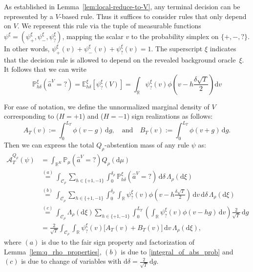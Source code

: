 \documentclass[10pt]{article}
\newcommand{\dd}{\mathrm{d}}
\theoremstyle{plain}
\begin{document}
As established in Lemma~\ref{lem:local-reduce-to-V}, any terminal decision can be represented by a $V$-based rule. Thus it suffices to consider rules that only depend on $V$. We represent this rule via the tuple of measurable functions $\psi^\xi = (\psi_+^\xi, \psi_-^\xi, \psi_?^\xi)$, mapping the scalar $v$ to the probability simplex on $\{+,-,?\}$. In other words,
$\psi_+^\xi(v) + \psi_-^\xi(v) + \psi_?^\xi(v) = 1.$
The superscript $\xi$ indicates that the decision rule is allowed to depend on the revealed background oracle~$\xi$. It follows that we can write 
\begin{equation} \label{integral_of_abs_prob}
    \mathbb P^\xi_{h\delta}\left( \hat{a}^V=? \right) 
    = \mathbb E^\xi_{h\delta}\left[ \psi^\xi_?(V) \right] 
    = \int_{\mathbb R} \psi^\xi_?(v) \phi\left( v - h\frac{\delta\sqrt{T}}{2} \right) \dd v
\end{equation}




For ease of notation, we define the unnormalized marginal density of $V$ corresponding to ($H=+1$) and ($H=-1$) sign realizations as follows:
$$A_T(v) := \int_0^{L_T} \phi(v-g)\,\dd g, \quad\mbox{and}\quad B_T(v) := \int_0^{L_T} \phi(v+g)\,\dd g.$$
Then we can express the total $Q_\rho$-abstention mass of any rule $\psi$ as:
$$
\begin{aligned}
\mathcal{A}_T^{Q_\rho}(\psi)
&= \int_{\mathbb R^K} \mathbb P_\mu\left(\hat{a}^V=?\right) Q_\rho(\dd\mu) \\
&\stackrel{(a)}{=} \int_{\mathcal{C}_\rho} \sum_{h \in \{+1,-1\}} \int^{\delta_\rho}_0 \mathbb P^\xi_{h\delta}\left(\hat{a}^V=?\right) \, \dd\delta \, \Lambda_\rho(\dd\xi) \\
&\stackrel{(b)}{=} \int_{\mathcal{C}_\rho} \sum_{h \in \{+1,-1\}} \int^{\delta_\rho}_0 \int_{\mathbb R} \psi^\xi_?(v) \phi\left(v - h\frac{\delta\sqrt{T}}{2}\right) \,\dd v\, \dd\delta\,  \Lambda_\rho(\dd\xi) \\
&\stackrel{(c)}{=} \int_{\mathcal{C}_\rho} \Lambda_\rho(\dd\xi) \sum_{h \in \{+1,-1\}} \int_0^{L_T} \left( \int_{\mathbb{R}} \psi_?^\xi(v)\phi(v-hg)\,\dd v \right) \frac{2}{\sqrt{T}}\,\dd g \\
&= \frac{2}{\sqrt{T}} \int_{\mathcal{C}_\rho} \int_{\mathbb{R}} \psi_?^\xi(v) \bigl[A_T(v) + B_T(v)\bigr] \,\dd v\,\Lambda_\rho(\dd\xi),
\end{aligned}
$$
where $(a)$ is due to the fair sign property and factorization of Lemma~\ref{lem:q_rho_properties}, $(b)$ is due to \eqref{integral_of_abs_prob} and $(c)$ is due to change of variables with $\dd\delta = \frac{2}{\sqrt{T}}\,\dd g.$ 
\end{document}
